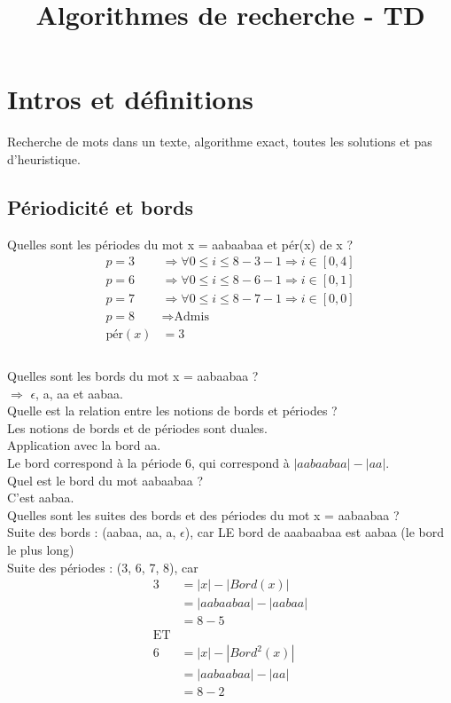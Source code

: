 \documentclass[11pt,a4paper]{article}
\title{Algorithmes de recherche - TD}
\begin{document}
	
	\maketitle
	\tableofcontents
	\listoffigures
	\newpage
	\section{Intros et définitions}
	
	Recherche de mots dans un texte, algorithme exact, toutes les solutions et pas d'heuristique.\\
	
	\subsection{Périodicité et bords}
	
	Quelles sont les périodes du mot x = aabaabaa et pér(x) de x ?
	\begin{align*}
		p = 3 &\Rightarrow \forall 0 \leq i \leq 8 - 3 - 1 \Rightarrow i \in [0, 4]\\
		p = 6 &\Rightarrow \forall 0 \leq i \leq 8 - 6 - 1 \Rightarrow i \in [0, 1]\\
		p = 7 &\Rightarrow \forall 0 \leq i \leq 8 - 7 - 1 \Rightarrow i \in [0, 0]\\
		p = 8 &\Rightarrow \text{Admis}\\
		\text{pér}(x) &= 3\\
	\end{align*}
	\\
	
	Quelles sont les bords du mot x = aabaabaa ?\\
	$\Rightarrow$ $\epsilon$, a, aa et aabaa.\\
	
	Quelle est la relation entre les notions de bords et périodes ?\\
	Les notions de bords et de périodes sont duales.\\
	
	Application avec la bord aa.\\
	Le bord correspond à la période 6, qui correspond à $|aabaabaa| - |aa|$.\\
	
	Quel est le bord du mot aabaabaa ?\\
	C'est aabaa.\\
	
	Quelles sont les suites des bords et des périodes du mot x = aabaabaa ?\\
	Suite des bords : (aabaa, aa, a, $\epsilon$), car LE bord de aaabaabaa est aabaa (le bord le plus long)\\
	Suite des périodes : (3, 6, 7, 8), car \begin{align*}
		3 &= |x| - |Bord(x)|\\
		&= |aabaabaa| - |aabaa|\\
		&= 8 - 5\\
		\text{ET}&\\
		6 &= |x| - |Bord^{2}(x)|\\
		&= |aabaabaa| - |aa|\\
		&= 8 - 2
	\end{align*}\\
	\newpage
\end{document}
